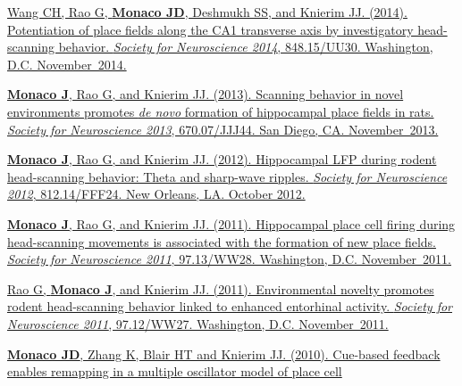 \documentclass[10pt]{article}
\begin{document}
\begin{description}
\href{http://www.abstractsonline.com/Plan/ViewAbstract.aspx?sKey=bfb59866-8deb-4
4a6-9515-a7aab630507b&cKey=d201b3aa-7725-452e-b0dd-c41d204b5b54&mKey=54c85d94-6d
69-4b09-afaa-502c0e680ca7}{Wang CH, Rao G, \textbf{Monaco JD}, Deshmukh SS, and
Knierim JJ. (2014). Potentiation of place fields along the CA1 transverse axis
by investigatory head-scanning behavior. \emph{Society for Neuroscience 2014},
848.15/UU30. Washington, D.C. November~2014.}
\item[\quad]
\href{http://www.abstractsonline.com/Plan/ViewAbstract.aspx?sKey=32eccac1-4e1d-4
e81-bf5c-f39bcb605757&cKey=4710dece-cc8e-4b48-8764-49ea174b91ef&mKey=8d2a5bec-48
25-4cd6-9439-b42bb151d1cf}{\textbf{Monaco J}, Rao G, and Knierim JJ. (2013).
Scanning behavior in novel environments promotes \emph{de novo} formation
of hippocampal place fields in rats. \emph{Society for Neuroscience 2013},
670.07/JJJ44. San Diego, CA. November~2013.}
\item[\quad]
\href{http://www.abstractsonline.com/Plan/ViewAbstract.aspx?sKey=f5b9fa94-7d15-4
8c7-9d67-b89cd2883025&cKey=a53349ca-41b1-4664-b022-85d0d1fe59b8&mKey=\%7b7000718
1-01C9-4DE9-A0A2-EEBFA14CD9F1\%7d}{\textbf{Monaco J}, Rao G, and Knierim
JJ. (2012). Hippocampal LFP during rodent head-scanning behavior: Theta and
sharp-wave ripples. \emph{Society for Neuroscience 2012}, 812.14/FFF24. New
Orleans, LA. October 2012.}
\item[\quad]
\href{http://www.abstractsonline.com/Plan/ViewAbstract.aspx?sKey=c48e9f5f-1274-4
486-85bf-38ee591629e1&cKey=190bd951-c183-428d-a4c5-01eb61556d79&mKey=\%7b8334BE2
9-8911-4991-8C31-32B32DD5E6C8\%7d}{\textbf{Monaco J}, Rao G, and Knierim
JJ. (2011). Hippocampal place cell firing during head-scanning movements
is associated with the formation of new place fields. \emph{Society for
Neuroscience 2011}, 97.13/WW28. Washington, D.C. November~2011.}
\item[\quad]
\href{http://www.abstractsonline.com/Plan/ViewAbstract.aspx?sKey=c48e9f5f-1274-4
486-85bf-38ee591629e1&cKey=3ec26e6f-8c59-4be2-bad3-e1572d75e07e&mKey=\%7b8334BE2
9-8911-4991-8C31-32B32DD5E6C8\%7d}{Rao G, \textbf{Monaco J}, and Knierim JJ.
(2011). Environmental novelty promotes rodent head-scanning behavior linked to
enhanced entorhinal activity. \emph{Society for Neuroscience 2011}, 97.12/WW27.
Washington, D.C. November~2011.}
\item[\quad]
\href{http://www.frontiersin.org/10.3389/conf.fnins.2010.03.00192/event_abstract
}{\textbf{Monaco JD}, Zhang K, Blair HT and Knierim JJ. (2010). Cue-based
feedback enables remapping in a multiple oscillator model of place cell
}
\end{description}
\end{document}
